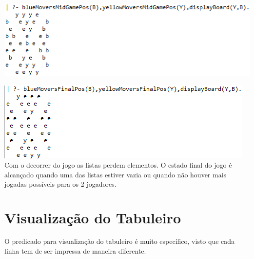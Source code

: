 \documentclass[a4paper]{article}
\begin{document}
\includegraphics[scale=1]{midGameBoard.PNG}\linebreak\linebreak

\includegraphics[scale=1]{endGameBoard.PNG}\linebreak\linebreak
Com o decorrer do jogo as listas perdem elementos. O estado final do jogo é alcançado quando uma das listas estiver vazia ou quando não houver mais jogadas possíveis para os 2 jogadores.


\section{Visualização do Tabuleiro}

O predicado para visualização do tabuleiro é muito específico, visto que cada linha tem de ser impressa de maneira diferente.
\end{document}
